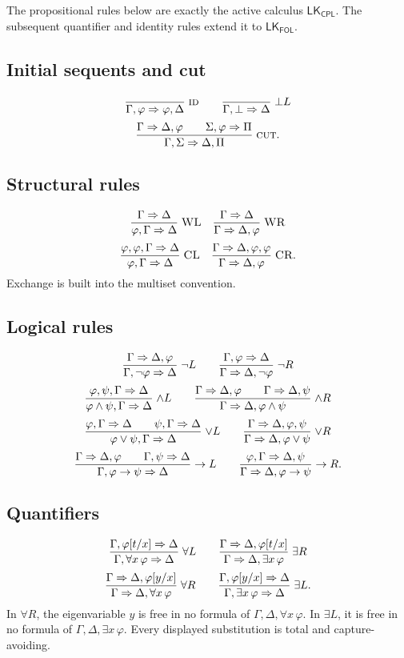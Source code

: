 \documentclass[11pt,oneside,openany]{book}
\theoremstyle{definition}
\theoremstyle{plain}
\theoremstyle{remark}
\newcommand{\bottom}{\bot}
\newcommand{\LK}{\mathsf{LK}}
\newcommand{\CPL}{\mathsf{CPL}}
\newcommand{\FOL}{\mathsf{FOL}}
\newcommand{\Rule}[3][]{\frac{#2}{#3}\;\textsc{#1}}
\begin{document}
The propositional rules below are exactly the active calculus
\(\LK_{\CPL}\).  The subsequent quantifier and identity rules extend it to
\(\LK_{\FOL}\).

\subsection*{Initial sequents and cut}
\[
\Rule[id]{}{\Gamma,\varphi\Rightarrow\varphi,\Delta}
\qquad
\Rule[\(\bottom L\)]{}{\Gamma,\bottom\Rightarrow\Delta}
\]
\[
\Rule[cut]{\Gamma\Rightarrow\Delta,\varphi\qquad
\Sigma,\varphi\Rightarrow\Pi}
{\Gamma,\Sigma\Rightarrow\Delta,\Pi}.
\]

\subsection*{Structural rules}
\[
\Rule[WL]{\Gamma\Rightarrow\Delta}{\varphi,\Gamma\Rightarrow\Delta}
\quad
\Rule[WR]{\Gamma\Rightarrow\Delta}{\Gamma\Rightarrow\Delta,\varphi}
\]
\[
\Rule[CL]{\varphi,\varphi,\Gamma\Rightarrow\Delta}
{\varphi,\Gamma\Rightarrow\Delta}
\quad
\Rule[CR]{\Gamma\Rightarrow\Delta,\varphi,\varphi}
{\Gamma\Rightarrow\Delta,\varphi}.
\]
Exchange is built into the multiset convention.

\subsection*{Logical rules}
\[
\Rule[\(\neg L\)]{\Gamma\Rightarrow\Delta,\varphi}
{\Gamma,\neg\varphi\Rightarrow\Delta}
\qquad
\Rule[\(\neg R\)]{\Gamma,\varphi\Rightarrow\Delta}
{\Gamma\Rightarrow\Delta,\neg\varphi}
\]
\[
\Rule[\(\land L\)]{\varphi,\psi,\Gamma\Rightarrow\Delta}
{\varphi\land\psi,\Gamma\Rightarrow\Delta}
\qquad
\Rule[\(\land R\)]{\Gamma\Rightarrow\Delta,\varphi\qquad
\Gamma\Rightarrow\Delta,\psi}
{\Gamma\Rightarrow\Delta,\varphi\land\psi}
\]
\[
\Rule[\(\lor L\)]{\varphi,\Gamma\Rightarrow\Delta\qquad
\psi,\Gamma\Rightarrow\Delta}
{\varphi\lor\psi,\Gamma\Rightarrow\Delta}
\qquad
\Rule[\(\lor R\)]{\Gamma\Rightarrow\Delta,\varphi,\psi}
{\Gamma\Rightarrow\Delta,\varphi\lor\psi}
\]
\[
\Rule[\(\to L\)]{\Gamma\Rightarrow\Delta,\varphi\qquad
\Gamma,\psi\Rightarrow\Delta}
{\Gamma,\varphi\to\psi\Rightarrow\Delta}
\qquad
\Rule[\(\to R\)]{\varphi,\Gamma\Rightarrow\Delta,\psi}
{\Gamma\Rightarrow\Delta,\varphi\to\psi}.
\]

\subsection*{Quantifiers}
\[
\Rule[\(\forall L\)]{\Gamma,\varphi[t/x]\Rightarrow\Delta}
{\Gamma,\forall x\,\varphi\Rightarrow\Delta}
\qquad
\Rule[\(\exists R\)]{\Gamma\Rightarrow\Delta,\varphi[t/x]}
{\Gamma\Rightarrow\Delta,\exists x\,\varphi}
\]
\[
\Rule[\(\forall R\)]{\Gamma\Rightarrow\Delta,\varphi[y/x]}
{\Gamma\Rightarrow\Delta,\forall x\,\varphi}
\qquad
\Rule[\(\exists L\)]{\Gamma,\varphi[y/x]\Rightarrow\Delta}
{\Gamma,\exists x\,\varphi\Rightarrow\Delta}.
\]
In \(\forall R\), the eigenvariable \(y\) is free in no formula of
\(\Gamma,\Delta,\forall x\,\varphi\).  In \(\exists L\), it is free in no
formula of \(\Gamma,\Delta,\exists x\,\varphi\).  Every displayed
substitution is total and capture-avoiding.
\end{document}
